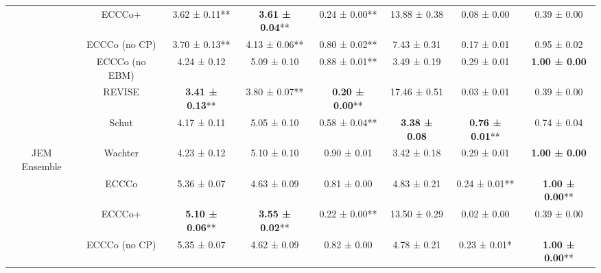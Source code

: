 \begin{table}
{\begin{tabular}[t]{cccccccc}
 & ECCCo+ & 3.62 ± 0.11** & \textbf{3.61 ± 0.04}** & 0.24 ± 0.00** & 13.88 ± 0.38\hphantom{*}\hphantom{*} & 0.08 ± 0.00\hphantom{*}\hphantom{*} & 0.39 ± 0.00\hphantom{*}\hphantom{*}\\

 & ECCCo (no CP) & 3.70 ± 0.13** & 4.13 ± 0.06** & 0.80 ± 0.02** & 7.43 ± 0.31\hphantom{*}\hphantom{*} & 0.17 ± 0.01\hphantom{*}\hphantom{*} & 0.95 ± 0.02\hphantom{*}\hphantom{*}\\

 & ECCCo (no EBM) & 4.24 ± 0.12\hphantom{*}\hphantom{*} & 5.09 ± 0.10\hphantom{*}\hphantom{*} & 0.88 ± 0.01** & 3.49 ± 0.19\hphantom{*}\hphantom{*} & 0.29 ± 0.01\hphantom{*}\hphantom{*} & \textbf{1.00 ± 0.00}\hphantom{*}\hphantom{*}\\

 & REVISE & \textbf{3.41 ± 0.13}** & 3.80 ± 0.07** & \textbf{0.20 ± 0.00}** & 17.46 ± 0.51\hphantom{*}\hphantom{*} & 0.03 ± 0.01\hphantom{*}\hphantom{*} & 0.39 ± 0.00\hphantom{*}\hphantom{*}\\

 & Schut & 4.17 ± 0.11\hphantom{*}\hphantom{*} & 5.05 ± 0.10\hphantom{*}\hphantom{*} & 0.58 ± 0.04** & \textbf{3.38 ± 0.08}\hphantom{*}\hphantom{*} & \textbf{0.76 ± 0.01}** & 0.74 ± 0.04\hphantom{*}\hphantom{*}\\

\multirow[t]{-7}{*}{\centering\arraybackslash JEM Ensemble} & Wachter & 4.23 ± 0.12\hphantom{*}\hphantom{*} & 5.10 ± 0.10\hphantom{*}\hphantom{*} & 0.90 ± 0.01\hphantom{*}\hphantom{*} & 3.42 ± 0.18\hphantom{*}\hphantom{*} & 0.29 ± 0.01\hphantom{*}\hphantom{*} & \textbf{1.00 ± 0.00}\hphantom{*}\hphantom{*}\\
\cmidrule{1-8}
 & ECCCo & 5.36 ± 0.07\hphantom{*}\hphantom{*} & 4.63 ± 0.09\hphantom{*}\hphantom{*} & 0.81 ± 0.00\hphantom{*}\hphantom{*} & 4.83 ± 0.21\hphantom{*}\hphantom{*} & 0.24 ± 0.01** & \textbf{1.00 ± 0.00}**\\

 & ECCCo+ & \textbf{5.10 ± 0.06}** & \textbf{3.55 ± 0.02}** & 0.22 ± 0.00** & 13.50 ± 0.29\hphantom{*}\hphantom{*} & 0.02 ± 0.00\hphantom{*}\hphantom{*} & 0.39 ± 0.00\hphantom{*}\hphantom{*}\\

 & ECCCo (no CP) & 5.35 ± 0.07\hphantom{*}\hphantom{*} & 4.62 ± 0.09\hphantom{*}\hphantom{*} & 0.82 ± 0.00\hphantom{*}\hphantom{*} & 4.78 ± 0.21\hphantom{*}\hphantom{*} & 0.23 ± 0.01*\hphantom{*} & \textbf{1.00 ± 0.00}**\\


\end{tabular}}
\end{table}
